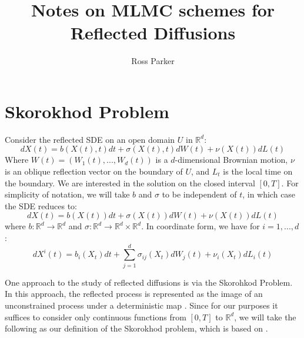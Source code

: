 \documentclass[]{article}
\theoremstyle{definition}
\theoremstyle{assumption}
\theoremstyle{remark}
\begin{document}
\title{Notes on MLMC schemes for Reflected Diffusions}
\author{Ross Parker}
\maketitle

\section{Skorokhod Problem}
Consider the reflected SDE on an open domain $U$ in $\mathbb{R}^d$:
\[
dX(t) = b(X(t), t)dt + \sigma(X(t), t)dW(t) + \nu(X(t))dL(t)
\]
Where $W(t) = (W_1(t), ..., W_d(t) )$ is a $d$-dimensional Brownian motion, $\nu$ is an oblique reflection vector on the boundary of $U$, and $L_t$ is the local time on the boundary. We are interested in the solution on the closed interval $[0, T]$. For simplicity of notation, we will take $b$ and $\sigma$ to be independent of $t$, in which case the SDE reduces to:
\begin{equation}
dX(t) = b(X(t))dt + \sigma(X(t))dW(t) + \nu(X(t))dL(t)
\end{equation}
where $b: \mathbb{R}^d \rightarrow \mathbb{R}^d$ and $\sigma: \mathbb{R}^d \rightarrow \mathbb{R}^d \times  \mathbb{R}^d$. In coordinate form, we have for $i = 1, ..., d$:
\begin{equation}
dX^i(t) = b_i(X_t)dt + \sum_{j = 1}^d \sigma_{ij}(X_t)dW_j(t) + \nu_i(X_t)dL_i(t)
\end{equation}
 
One approach to the study of reflected diffusions is via the Skorohkod Problem. In this approach, the reflected process is represented as the image of an unconstrained process under a deterministic map \cite[p. 936]{Ram06}. Since for our purposes it suffices to consider only continuous functions from $[0, T]$ to $\mathbb{R}^d$, we will take the following as our definition of the Skorokhod problem, which is based on \cite[Theorem 1]{HR81}.
\end{document}
